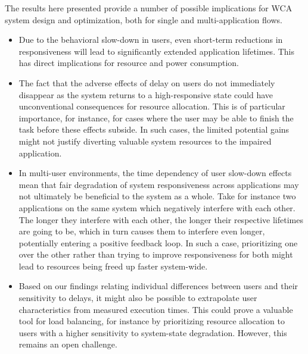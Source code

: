 The results here presented provide a number of possible implications for WCA system design and optimization, both for single and multi-application flows.

\begin{itemize}

    \item Due to the behavioral slow-down in users, even short-term reductions in responsiveness will lead to significantly extended application lifetimes.
          This has direct implications for resource and power consumption.

    \item The fact that the adverse effects of delay on users do not immediately disappear as the system returns to a high-responsive state could have unconventional consequences for resource allocation.
          This is of particular importance, for instance, for cases where the user may be able to finish the task before these effects subside.
          In such cases, the limited potential gains might not justify diverting valuable system resources to the impaired application.

    \item In multi-user environments, the time dependency of user slow-down effects mean that fair degradation of system responsiveness across applications may not ultimately be beneficial to the system as a whole.
          Take for instance two applications on the same system which negatively interfere with each other.
          The longer they interfere with each other, the longer their respective lifetimes are going to be, which in turn causes them to interfere even longer, potentially entering a positive feedback loop.
          In such a case, prioritizing one over the other rather than trying to improve responsiveness for both might lead to resources being freed up faster system-wide.

    \item Based on our findings relating individual differences between users and their sensitivity to delays, it might also be possible to extrapolate user characteristics from measured execution times.
          This could prove a valuable tool for load balancing, for instance by prioritizing resource allocation to users with a higher sensitivity to system-state degradation.
          However, this remains an open challenge.

\end{itemize}

